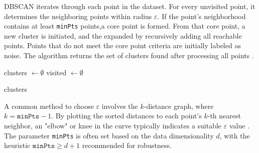 \documentclass[class=report,11pt,crop=false]{standalone}
\begin{document}
DBSCAN iterates through each point in the dataset. For every unvisited point, it determines the neighboring points within radius \(\varepsilon\). If the point's neighborhood contains at least \texttt{minPts} points,a core point is formed. From that core point, a new cluster is initiated, and the expanded by recursively adding all reachable points. Points that do not meet the core point criteria are initially labeled as noise. The algorithm returns the set of clusters found after processing all points \cite{ester1996dbscan}.

\begin{algorithm}[H]
\label{alg:DBSCAN}
\caption{DBSCAN Algorithm}

clusters $\leftarrow \emptyset$\;
visited $\leftarrow \emptyset$\;


\Return clusters

\vspace{5pt}
\end{algorithm}

A common method to choose \(\varepsilon\) involves the \(k\)-distance graph, where \(k = \texttt{minPts} - 1\). By plotting the sorted distances to each point’s \(k\)-th nearest neighbor, an "elbow" or knee in the curve typically indicates a suitable \(\varepsilon\) value \cite{schubert2017dbscan}. The parameter \texttt{minPts} is often set based on the data dimensionality \(d\), with the heuristic \(\texttt{minPts} \geq d + 1\) recommended for robustness.
\end{document}
